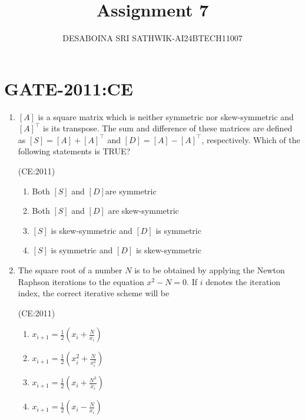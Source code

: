\documentclass[journal,12pt,onecolumn]{IEEEtran}
\theoremstyle{remark}
\begin{document}

\vspace{3cm}

\title{Assignment 7}
\author{DESABOINA SRI SATHWIK-AI24BTECH11007}
\maketitle
\bigskip

\section*{GATE-2011:CE}

\begin{enumerate}
\item 
	 $[A]$ is a square matrix which is neither symmetric nor skew-symmetric and $[A]^\top$ is its transpose. The sum and difference of these matrices are defined as $[S] = [A] + [A]^\top$ and $[D] = [A] - [A]^\top$, respectively. Which of the following statements is TRUE?

		\hfill (CE:2011)
    
        \begin{enumerate}
            \item Both $[S]$ and $[D]$are symmetric
            \item Both $[S]$ and $[D]$ are skew-symmetric
            \item $[S]$ is skew-symmetric and $[D]$ is symmetric
            \item $[S]$ is symmetric and $[D]$ is skew-symmetric
        \end{enumerate}
\vspace{1cm}
    \item 
	    The square root of a number $N$ is to be obtained by applying the Newton Raphson iterations to the equation $x^2 - N = 0$. If $i$ denotes the iteration index, the correct iterative scheme will be

		\hfill (CE:2011)
    \begin{multicols}{2}
	    \begin{enumerate}
            \item $x_{i+1} = \frac{1}{2} \left( x_i + \frac{N}{x_i} \right)$
            \item $x_{i+1} = \frac{1}{2} \left( x_i^2 + \frac{N}{x_i^2} \right)$
            \item $x_{i+1} = \frac{1}{2} \left( x_i + \frac{N^2}{x_i} \right)$
            \item $x_{i+1} = \frac{1}{2} \left( x_i - \frac{N}{x_i} \right)$
        \end{enumerate}
    \end{multicols}


\end{enumerate}
\end{document}
